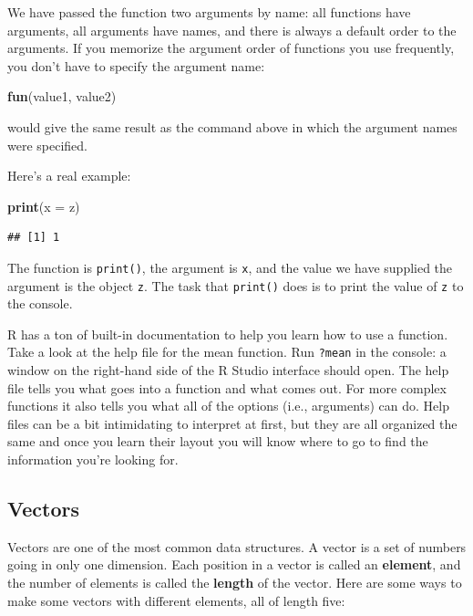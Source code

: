 \documentclass[]{book}
\newenvironment{Shaded}{\begin{snugshade}}{\end{snugshade}}
\newcommand{\KeywordTok}[1]{\textcolor[rgb]{0.13,0.29,0.53}{\textbf{#1}}}
\newcommand{\DataTypeTok}[1]{\textcolor[rgb]{0.13,0.29,0.53}{#1}}
\newcommand{\NormalTok}[1]{#1}
\theoremstyle{definition}
\theoremstyle{definition}
\theoremstyle{definition}
\theoremstyle{remark}
\begin{document}
We have passed the function two arguments by name: all functions have
arguments, all arguments have names, and there is always a default order
to the arguments. If you memorize the argument order of functions you
use frequently, you don't have to specify the argument name:

\begin{Shaded}
\begin{Highlighting}[]
\KeywordTok{fun}\NormalTok{(value1, value2)}
\end{Highlighting}
\end{Shaded}

would give the same result as the command above in which the argument
names were specified.

Here's a real example:

\begin{Shaded}
\begin{Highlighting}[]
\KeywordTok{print}\NormalTok{(}\DataTypeTok{x =}\NormalTok{ z)}
\end{Highlighting}
\end{Shaded}

\begin{verbatim}
## [1] 1
\end{verbatim}

The function is \texttt{print()}, the argument is \texttt{x}, and the
value we have supplied the argument is the object \texttt{z}. The task
that \texttt{print()} does is to print the value of \texttt{z} to the
console.

R has a ton of built-in documentation to help you learn how to use a
function. Take a look at the help file for the mean function. Run
\texttt{?mean} in the console: a window on the right-hand side of the R
Studio interface should open. The help file tells you what goes into a
function and what comes out. For more complex functions it also tells
you what all of the options (i.e., arguments) can do. Help files can be
a bit intimidating to interpret at first, but they are all organized the
same and once you learn their layout you will know where to go to find
the information you're looking for.

\subsection{Vectors}\label{vectors}

Vectors are one of the most common data structures. A vector is a set of
numbers going in only one dimension. Each position in a vector is called
an \textbf{element}, and the number of elements is called the
\textbf{length} of the vector. Here are some ways to make some vectors
with different elements, all of length five:
\end{document}
